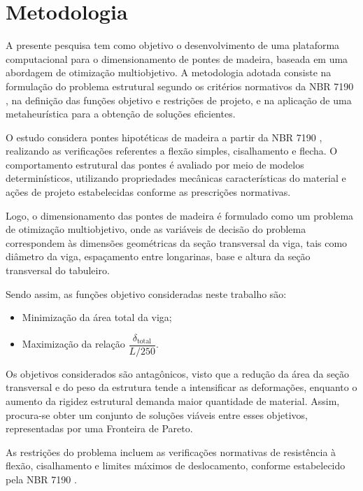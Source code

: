 \chapter{Metodologia}\label{sec:metodologia}

A presente pesquisa tem como objetivo o desenvolvimento de uma plataforma computacional para o dimensionamento de pontes de madeira, baseada em uma abordagem de otimização multiobjetivo. A metodologia adotada consiste na formulação do problema estrutural segundo os critérios normativos da NBR 7190 \cite{NBR7190-1:2022}, na definição das funções objetivo e restrições de projeto, e na aplicação de uma metaheurística para a obtenção de soluções eficientes.

O estudo considera pontes hipotéticas de madeira a partir da NBR 7190 \cite{NBR7190-1:2022}, realizando as verificações referentes a flexão simples, cisalhamento e flecha. O comportamento estrutural das pontes é avaliado por meio de modelos determinísticos, utilizando propriedades mecânicas características do material e ações de projeto estabelecidas conforme as prescrições normativas.

Logo, o dimensionamento das pontes de madeira é formulado como um problema de otimização multiobjetivo, onde as variáveis de decisão do problema correspondem às dimensões geométricas da seção transversal da viga, tais como diâmetro da viga, espaçamento entre longarinas, base e altura da seção transversal do tabuleiro.

Sendo assim, as funções objetivo consideradas neste trabalho são:

\begin{itemize}
    \item Minimização da área total da viga;
    \item Maximização da relação $\dfrac{\delta_{\text{total}}}{L/250}$.
\end{itemize}

Os objetivos considerados são antagônicos, visto que a redução da área da seção transversal e do peso da estrutura tende a intensificar as deformações, enquanto o aumento da rigidez estrutural demanda maior quantidade de material. Assim, procura-se obter um conjunto de soluções viáveis entre esses objetivos, representadas por uma Fronteira de Pareto.

As restrições do problema incluem as verificações normativas de resistência à flexão, cisalhamento e limites máximos de deslocamento, conforme estabelecido pela NBR 7190 \cite{NBR7190-1:2022}.

